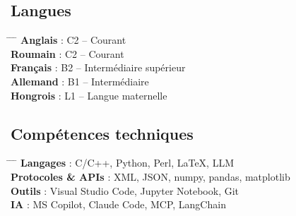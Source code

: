 \documentclass[a4paper,10pt]{article}
\begin{document}
\subsection*{Langues}
\begin{tabbing}
    \hspace{0.55cm} \= \hspace{2.55cm} \= \hspace{3cm} \= \kill
    \> \textbf{Anglais} :  \> C2 -- Courant \\
    \> \textbf{Roumain} :  \> C2 -- Courant \\
    \> \textbf{Français} :   \> B2 -- Intermédiaire supérieur \\
    \> \textbf{Allemand} :   \> B1 -- Intermédiaire \\
    \> \textbf{Hongrois} : \> L1 -- Langue maternelle \\
\end{tabbing}

\subsection*{Compétences techniques}
\begin{tabbing}
    \hspace{0.55cm} \= \hspace{4.55cm} \= \hspace{3cm} \= \kill
    \> \textbf{Langages} :  \> C/C++, Python, Perl, LaTeX, LLM \\
    \> \textbf{Protocoles \& APIs} :  \> XML, JSON, numpy, pandas, matplotlib \\
    \> \textbf{Outils} :   \> Visual Studio Code, Jupyter Notebook, Git \\
    \> \textbf{IA} :   \> MS Copilot, Claude Code, MCP, LangChain \\
\end{tabbing}
\end{document}
